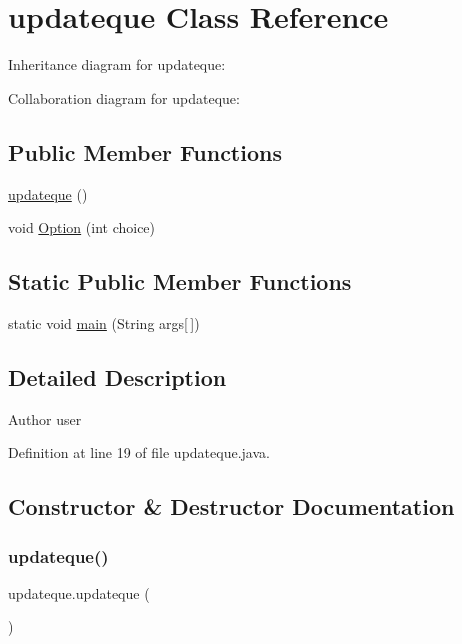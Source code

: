 \hypertarget{classupdateque}{}\section{updateque Class Reference}
\label{classupdateque}


Inheritance diagram for updateque\+:


Collaboration diagram for updateque\+:
\subsection*{Public Member Functions}
\begin{DoxyCompactItemize}
\item 
\mbox{\hyperlink{classupdateque_ad5555e9a45602ab81e5fbcd92b483966}{updateque}} ()
\item 
void \mbox{\hyperlink{classupdateque_ab70d99a1a03205a7e4587d32b4e7bfa5}{Option}} (int choice)
\end{DoxyCompactItemize}
\subsection*{Static Public Member Functions}
\begin{DoxyCompactItemize}
\item 
static void \mbox{\hyperlink{classupdateque_a23b646977558bf1eaed30f2d08b3b16a}{main}} (String args\mbox{[}$\,$\mbox{]})
\end{DoxyCompactItemize}


\subsection{Detailed Description}
\begin{DoxyAuthor}{Author}
user 
\end{DoxyAuthor}


Definition at line 19 of file updateque.\+java.



\subsection{Constructor \& Destructor Documentation}
\mbox{\label{classupdateque_ad5555e9a45602ab81e5fbcd92b483966}} 
\subsubsection{\texorpdfstring{updateque()}{updateque()}}
{\footnotesize\ttfamily updateque.\+updateque (\begin{DoxyParamCaption}{ }\end{DoxyParamCaption})}

